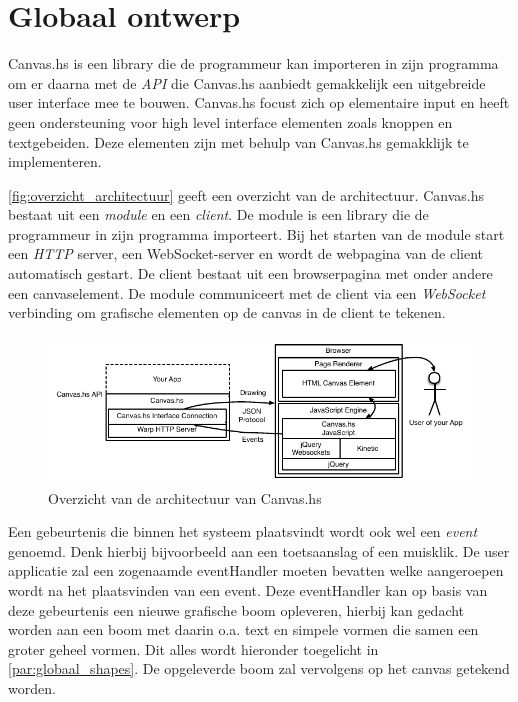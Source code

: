 \section{Globaal ontwerp}  \label{sec:globaal}
Canvas.hs is een library die de programmeur kan importeren in zijn programma om er daarna met de \emph{API} die Canvas.hs aanbiedt gemakkelijk een uitgebreide user interface mee te bouwen. Canvas.hs focust zich op elementaire input en heeft geen ondersteuning voor high level interface elementen zoals knoppen en textgebeiden. Deze elementen zijn met behulp van Canvas.hs gemakklijk te implementeren.

\autoref{fig:overzicht_architectuur} geeft een overzicht van de architectuur. Canvas.hs bestaat uit een \emph{module} en een \emph{client}. De module is een library die de programmeur in zijn programma importeert. Bij het starten van de module start een \emph{HTTP} server, een WebSocket-server en wordt de webpagina van de client automatisch gestart. De client bestaat uit een browserpagina met onder andere een canvaselement. De module communiceert met de client via een \emph{WebSocket} verbinding om grafische elementen op de canvas in de client te tekenen.

\begin{figure}[H]
\begin{center}
\includegraphics[keepaspectratio,width=\textwidth]{./images/architectuur_overzicht.pdf}
\caption{Overzicht van de architectuur van Canvas.hs}
\label{fig:overzicht_architectuur}
\end{center}
\end{figure}

Een gebeurtenis die binnen het systeem plaatsvindt wordt ook wel een \emph{event} genoemd. Denk hierbij bijvoorbeeld aan een toetsaanslag of een muisklik. De user applicatie zal een zogenaamde eventHandler moeten bevatten welke aangeroepen wordt na het plaatsvinden van een event. Deze eventHandler kan op basis van deze gebeurtenis een nieuwe grafische boom opleveren, hierbij kan gedacht worden aan een boom met daarin o.a. text en simpele vormen die samen een groter geheel vormen. Dit alles wordt hieronder toegelicht in \autoref{par:globaal_shapes}. De opgeleverde boom zal vervolgens op het canvas getekend worden. 

